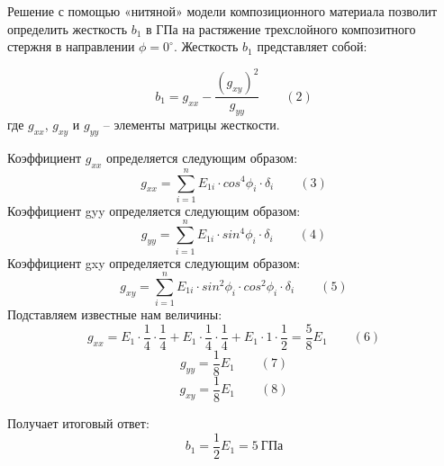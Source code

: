 Решение с помощью «нитяной» модели композиционного материала 
позволит определить жесткость $b_1$ в ГПа на растяжение 
трехслойного композитного стержня в направлении $\phi = 0^\circ$. 
Жесткость $b_1$ представляет собой: 

$$b_1=g_{xx}-\frac{(g_{xy})^2}{g_{yy}} \qquad (2)$$
где $g_{xx}$, $g_{xy}$ и $g_{yy}$ – элементы матрицы жесткости.

Коэффициент $g_{xx}$ определяется следующим образом:
$$g_{xx}=\sum_{i=1}^n E_{1i} \cdot cos^4 \phi_i \cdot \delta_i \qquad (3)$$
Коэффициент gyy определяется следующим образом:
$$g_{yy}=\sum_{i=1}^n E_{1i} \cdot sin^4 \phi_i \cdot \delta_i \qquad (4)$$
Коэффициент gxy определяется следующим образом:
$$g_{xy}=\sum_{i=1}^n E_{1i} \cdot sin^2 \phi_i \cdot cos^2 \phi_i \cdot \delta_i \qquad (5)$$
Подставляем известные нам величины:
$$g_{xx}=E_1 \cdot \frac{1}{4} \cdot \frac{1}{4}+E_1 \cdot \frac{1}{4} \cdot \frac{1}{4}+E_1 \cdot 1 \cdot \frac{1}{2}=\frac{5}{8} E_1 \qquad (6)$$
$$g_{yy}=\frac{1}{8} E_1 \qquad (7)$$
$$g_{xy}=\frac{1}{8} E_1 \qquad (8)$$

Получает итоговый ответ:
$$b_1=\frac{1}{2} E_1=5 \: \text{ГПа}$$

